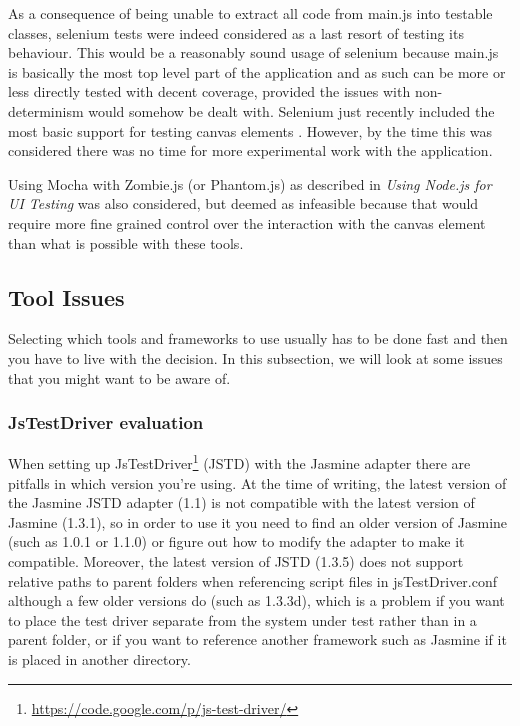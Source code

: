 \documentclass[11pt]{article}
\begin{document}
As a consequence of being unable to extract all code from main.js into testable classes, selenium tests were indeed considered as a last resort of testing its behaviour. This would be a reasonably sound usage of selenium because main.js is basically the most top level part of the application and as such can be more or less directly tested with decent coverage, provided the issues with non-determinism would somehow be dealt with. Selenium just recently included the most basic support for testing canvas elements \cite[p.~165-166]{Selenium2}. However, by the time this was considered there was no time for more experimental work with the application.

Using Mocha with Zombie.js (or Phantom.js) as described in \emph{Using Node.js for UI Testing} \cite{UsingNode} was also considered, but deemed as infeasible because that would require more fine grained control over the interaction with the canvas element than what is possible with these tools.

\subsection{Tool Issues}

Selecting which tools and frameworks to use usually has to be done fast and then you have to live with the decision. In this subsection, we will look at some issues that you might want to be aware of.

\subsubsection{JsTestDriver evaluation}
\label{subsec:jstestdriver}

When setting up JsTestDriver\footnote{\url{https://code.google.com/p/js-test-driver/}} (JSTD) with the Jasmine adapter there are pitfalls in which version you're using. At the time of writing, the latest version of the Jasmine JSTD adapter (1.1) is not compatible with the latest version of Jasmine (1.3.1), so in order to use it you need to find an older version of Jasmine (such as 1.0.1 or 1.1.0) or figure out how to modify the adapter to make it compatible. Moreover, the latest version of JSTD (1.3.5) does not support relative paths to parent folders when referencing script files in jsTestDriver.conf although a few older versions do (such as 1.3.3d), which is a problem if you want to place the test driver separate from the system under test rather than in a parent folder, or if you want to reference another framework such as Jasmine if it is placed in another directory. %
\end{document}
